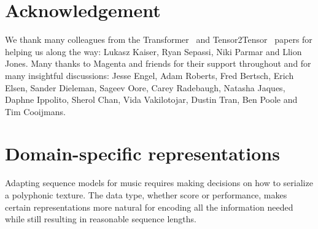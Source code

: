\documentclass{article} \usepackage{iclr2019_conference,times}
\begin{document}
\section{Acknowledgement}
We thank many colleagues from the Transformer~\citep{vaswani2017attention} and Tensor2Tensor~\citep{tensor2tensor} papers for helping us along the way: Lukasz Kaiser, Ryan Sepassi, Niki Parmar and Llion Jones.  Many thanks to Magenta and friends for their support throughout and for many insightful discussions: Jesse Engel, Adam Roberts, Fred Bertsch, Erich Elsen, Sander Dieleman, Sageev Oore, Carey Radebaugh, Natasha Jaques, Daphne Ippolito, Sherol Chan, Vida Vakilotojar, Dustin Tran, Ben Poole and Tim Cooijmans. 












\newpage
\appendix
\section{Domain-specific representations}
\label{domain}
Adapting sequence models for music requires making decisions on how to serialize a polyphonic texture.  The data type, whether score or performance, makes certain representations more natural for encoding all the information needed while still resulting in reasonable sequence lengths.  
\end{document}

